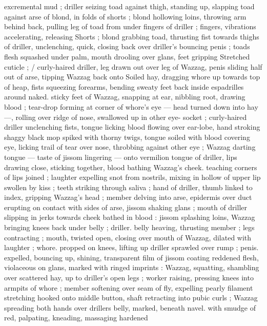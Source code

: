 excremental mud ; driller seizing toad against thigh, standing up, 
slapping toad against arse of blond, in folds of shorts ; blond 
hollowing loins, throwing arm behind back, pulling leg of toad from 
under fingers of driller ; fingers, vibrations accelerating, releasing 
Shorts ; blond grabbing toad, thrusting fist towards thighs of driller, 
unclenching, quick, closing back over driller's bouncing penis ; toads 
flesh squashed under palm, mouth drooling over glans, feet gripping 
Stretched cuticle ; {\slash} curly-haired driller, leg drawn out over leg of 
Wazzag, penis sliding half out of arse, tipping Wazzag back onto 
Soiled hay, dragging whore up towards top of heap, fists squeezing 
forearms, bending sweaty feet back inside espadrilles around naked. 
sticky feet of Wazzag, snapping at ear, nibbling root, drawing blood 
; tear-drop forming at corner of whore's eye --- head turned down 
into hay ---, rolling over ridge of nose, swallowed up in other eye- 
socket ; curly-haired driller unclenching fists, tongue licking blood 
flowing over ear-lobe, hand stroking shaggy black mop spiked with 
thorny twigs, tongue soiled with blood covering eye, licking trail of 
tear over nose, throbbing against other eye ; Wazzag darting tongue 
--- taste of jissom lingering --- onto vermilion tongue of driller, lips 
drawing close, sticking together, blood bathing Wazzag's cheek. 
teaching corners of lips joined ; laughter expelling snot from 
nostrils, mixing in hollow of upper lip swollen by kiss ; teeth striking 
through saliva ; hand of driller, thumb linked to index, gripping 
Wazzag's head ; member delving into arse, epidermis over duct 
erupting on contact with sides of arse, jissom shaking glans ; mouth 
of driller slipping in jerks towards cheek bathed in blood : jissom 
splashing loins, Wazzag bringing knees back under belly ; driller. 
belly heaving, thrusting member ; legs contracting ; mouth, twisted 
open, closing over mouth of Wazzag, dilated with laughter ; whore. 
propped on knees, lifting up driller sprawled over rump ; penis. 
expelled, bouncing up, shining, transparent film of jissom coating 
reddened flesh, violaceous on glans, marked with ringed imprints : 
Wazzag, squatting, shambling over scattered hay, up to driller's open 
legs ; worker raising, pressing knees into armpits of whore ; member 
softening over seam of fly, expelling pearly filament stretching 
hooked onto middle button, shaft retracting into pubic curls ; Wazzag 
spreading both hands over drillers belly, marked, beneath navel. 
with smudge of red, palpating, kneading, massaging hardened 
